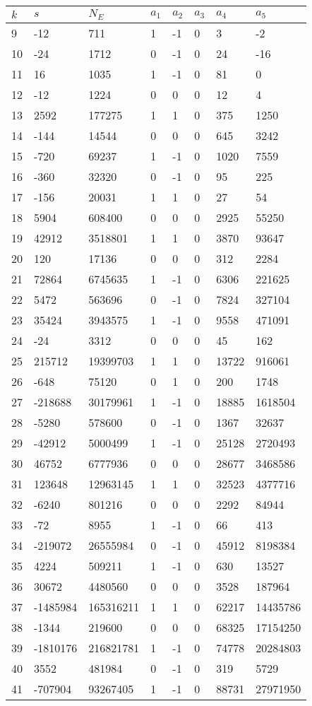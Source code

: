 \documentclass{amsart}
\begin{document}
\begin{longtable}{|l|l|l|lllll|}
\hline
$k$ & $s$ & $N_E$ & $a_1$ & $a_2$ & $a_3$ & $a_4$ & $a_5$\\
\hline
9&-12&711&1&-1&0&3&-2\\
10&-24&1712&0&-1&0&24&-16\\
11&16&1035&1&-1&0&81&0\\
12&-12&1224&0&0&0&12&4\\
13&2592&177275&1&1&0&375&1250\\
14&-144&14544&0&0&0&645&3242\\
15&-720&69237&1&-1&0&1020&7559\\
16&-360&32320&0&-1&0&95&225\\
17&-156&20031&1&1&0&27&54\\
18&5904&608400&0&0&0&2925&55250\\
19&42912&3518801&1&1&0&3870&93647\\
20&120&17136&0&0&0&312&2284\\
21&72864&6745635&1&-1&0&6306&221625\\
22&5472&563696&0&-1&0&7824&327104\\
23&35424&3943575&1&-1&0&9558&471091\\
24&-24&3312&0&0&0&45&162\\
25&215712&19399703&1&1&0&13722&916061\\
26&-648&75120&0&1&0&200&1748\\
27&-218688&30179961&1&-1&0&18885&1618504\\
28&-5280&578600&0&-1&0&1367&32637\\
29&-42912&5000499&1&-1&0&25128&2720493\\
30&46752&6777936&0&0&0&28677&3468586\\
31&123648&12963145&1&1&0&32523&4377716\\
32&-6240&801216&0&0&0&2292&84944\\
33&-72&8955&1&-1&0&66&413\\
34&-219072&26555984&0&-1&0&45912&8198384\\
35&4224&509211&1&-1&0&630&13527\\
36&30672&4480560&0&0&0&3528&187964\\
37&-1485984&165316211&1&1&0&62217&14435786\\
38&-1344&219600&0&0&0&68325&17154250\\
39&-1810176&216821781&1&-1&0&74778&20284803\\
40&3552&481984&0&-1&0&319&5729\\
41&-707904&93267405&1&-1&0&88731&27971950\\

\end{longtable}
\end{document}
